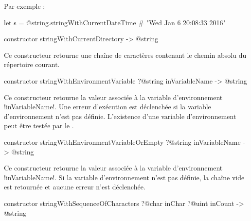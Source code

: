 Par exemple :
\begin{galgas3}
let s = @string.stringWithCurrentDateTime # "Wed Jan  6 20:08:33 2016"
\end{galgas3}








\begin{galgas3box}
constructor stringWithCurrentDirectory -> @string
\end{galgas3box}

Ce constructeur retourne une chaîne de caractères contenant le chemin absolu du répertoire courant.





\begin{galgas3box}
constructor stringWithEnvironmentVariable
  ?@string inVariableName
  -> @string
\end{galgas3box}

Ce constructeur retourne la valeur associée à la variable d'environnement \ggst!inVariableName!. Une erreur d'exécution est déclenchée si la variable d'environnement n'est pas définie. L'existence d'une variable d'environnement peut être testée par le .






\begin{galgas3box}
constructor stringWithEnvironmentVariableOrEmpty
  ?@string inVariableName
  -> @string
\end{galgas3box}

Ce constructeur retourne la valeur associée à la variable d'environnement \ggst!inVariableName!. Si la variable d'environnement n'est pas définie, la chaîne vide est retournée et aucune erreur n'est déclenchée.







\begin{galgas3box}
constructor stringWithSequenceOfCharacters
  ?@char inChar
  ?@uint inCount
  -> @string
\end{galgas3box}

